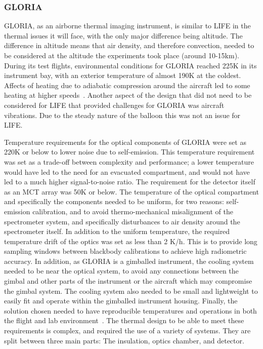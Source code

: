 \subsubsection{GLORIA}
GLORIA, as an airborne thermal imaging instrument, is similar to LIFE in the thermal issues it will face, with the only major difference being altitude. The difference in altitude means that air density, and therefore convection, needed to be considered at the altitude the experiments took place (around 10-15km). During its test flights, environmental conditions for GLORIA reached 225K in its instrument bay, with an exterior temperature of almost 190K at the coldest. Affects of heating due to adiabatic compression around the aircraft led to some heating at higher speeds~\citep{GLORIA_thermalmech}. Another aspect of the design that did not need to be considered for LIFE that provided challenges for GLORIA was aircraft vibrations. Due to the steady nature of the balloon this was not an issue for LIFE.

Temperature requirements for the optical components of GLORIA were set as 220K or below to lower noise due to self-emission. This temperature requirement was set as a trade-off between complexity and performance; a lower temperature would have led to the need for an evacuated compartment, and would not have led to a much higher signal-to-noise ratio. The requirement for the detector itself as an MCT array was 50K or below. The temperature of the optical compartment and specifically the components needed to be uniform, for two reasons: self-emission calibration, and to avoid thermo-mechanical misalignment of the spectrometer system, and specifically disturbances to air density around the spectrometer itself. In addition to the uniform temperature, the required temperature drift of the optics was set as less than 2 K/h. This is to provide long sampling windows between blackbody calibrations to achieve high radiometric accuracy. In addition, as GLORIA is a gimballed instrument, the cooling system needed to be near the optical system, to avoid any connections between the gimbal and other parts of the instrument or the aircraft which may compromise the gimbal system. The cooling system also needed to be small and lightweight to easily fit and operate within the gimballed instrument housing. Finally, the solution chosen needed to have reproducible temperatures and operations in both the flight and lab environment~\citep{GLORIA_thermalmech}. The thermal design to be able to meet these requirements is complex, and required the use of a variety of systems. They are split between three main parts: The insulation, optics chamber, and detector.

